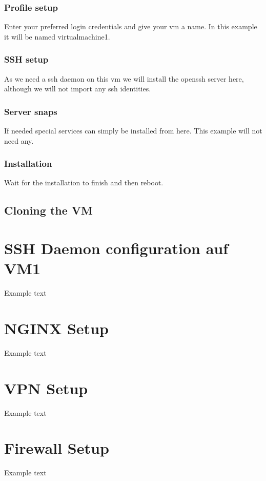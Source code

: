 \documentclass[10pt,a4paper]{article}
\begin{document}
\subsubsection{Profile setup}
Enter your preferred login credentials and give your vm a name. In this example it will be named virtualmachine1.

\subsubsection{SSH setup}
As we need a ssh daemon on this vm we will install the openssh server here, although we will not import any ssh identities.

\subsubsection{Server snaps}
If needed special services can simply be installed from here. This example will not need any.

\subsubsection{Installation}
Wait for the installation to finish and then reboot.

\subsection{Cloning the VM}

\newpage
\section{SSH Daemon configuration auf VM1}
Example text

\newpage
\section{NGINX Setup}
Example text

\newpage
\section{VPN Setup}
Example text

\newpage
\section{Firewall Setup}
Example text
\end{document}
